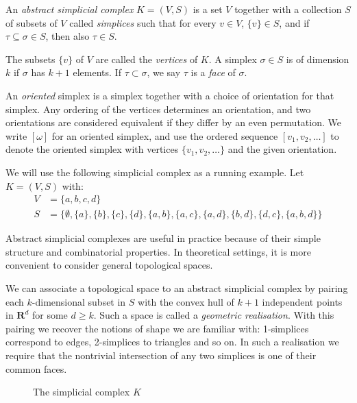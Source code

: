 \begin{definition}
An \emph{abstract simplicial complex} $K = (V, S)$ is a set $V$ together with a collection $S$ of subsets of $V$ called \emph{simplices} such that for every $v \in V$, $\{v\} \in S$, and if $\tau \subseteq \sigma \in S$, then also $\tau \in S$.

The subsets $\{v\}$ of $V$ are called the \emph{vertices} of $K$. A simplex $\sigma \in S$ is of dimension $k$ if $\sigma$ has $k+1$ elements. If $\tau \subset \sigma$, we say $\tau$ is a \emph{face} of $\sigma$.

An \emph{oriented} simplex is a simplex together with a choice of orientation for that simplex. Any ordering of the vertices determines an orientation, and two orientations are considered equivalent if they differ by an even permutation. We write $[\omega]$ for an oriented simplex, and use the ordered sequence $[v_1, v_2, \dots]$ to denote the oriented simplex with vertices $\{v_1, v_2, \dots \}$ and the given orientation.
\end{definition}

\begin{example}
We will use the following simplicial complex as a running example. Let $K = (V, S)$ with:
\begin{align*}
  V &= \{a, b, c, d\} \\
  S &= \{\emptyset, \{a\}, \{b\}, \{c\}, \{d\}, \{a, b\}, \{a, c\}, \{a, d\}, \{b, d\}, \{d, c\}, \{a, b, d\}\}
\end{align*}
\end{example}

Abstract simplicial complexes are useful in practice because of their simple structure and combinatorial properties. In theoretical settings, it is more convenient to consider general topological spaces.

We can associate a topological space to an abstract simplicial complex by pairing each $k$-dimensional subset in $S$ with the convex hull of $k+1$ independent points in $\mathbf{R}^d$ for some $d \geq k$. Such a space is called a \emph{geometric realisation}. With this pairing we recover the notions of shape we are familiar with: 1-simplices correspond to edges, 2-simplices to triangles and so on. In such a realisation we require that the nontrivial intersection of any two simplices is one of their common faces.

\begin{figure}[h]
\centering
{}
\caption{The simplicial complex $K$}
\label{fig:simplicial}
\end{figure}

